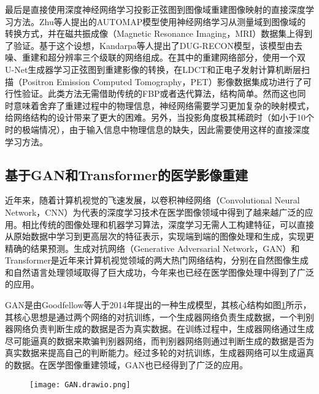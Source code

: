 最后是直接使用深度神经网络学习投影正弦图到图像域重建图像映射的直接深度学习方法。Zhu等人提出的AUTOMAP模型使用神经网络学习从测量域到图像域的转换方式，并在磁共振成像（Magnetic Resonance Imaging，MRI）数据集上得到了验证\cite{zhuImageReconstructionDomaintransform2018}。基于这个设想，Kandarpa等人提出了DUG-RECON模型，该模型由去噪、重建和超分辨率三个级联的网络组成。在其中的重建网络部分，使用一个双U-Net生成器学习正弦图到重建影像的转换，在LDCT和正电子发射计算机断层扫描（Positron Emission Computed Tomography，PET）影像数据集成功进行了可行性验证\cite{kandarpaDUGRECONFrameworkDirect2021}。此类方法无需借助传统的FBP或者迭代算法，结构简单。然而这也同时意味着舍弃了重建过程中的物理信息，神经网络需要学习更加复杂的映射模式，给网络结构的设计带来了更大的困难。另外，当投影角度极其稀疏时（如小于10个时的极端情况），由于输入信息中物理信息的缺失，因此需要使用这样的直接深度学习方法。


\subsection{基于GAN和Transformer的医学影像重建}
近年来，随着计算机视觉的飞速发展，以卷积神经网络（Convolutional Neural Network，CNN）为代表的深度学习技术在医学图像领域中得到了越来越广泛的应用。相比传统的图像处理和机器学习算法，深度学习无需人工构建特征，可以直接从原始数据中学习到更高层次的特征表示，实现端到端的图像处理和生成，实现更精确的结果预测。生成对抗网络（Generative Adversarial Network，GAN）和Transformer是近年来计算机视觉领域的两大热门网络结构，分别在自然图像生成和自然语言处理领域取得了巨大成功，今年来也已经在医学图像处理中得到了广泛的应用。

GAN是由Goodfellow等人\cite{goodfellowGenerativeAdversarialNets2014}于2014年提出的一种生成模型，其核心结构如图\ref{fig. GAN}所示，其核心思想是通过两个网络的对抗训练，一个生成器网络负责生成数据，一个判别器网络负责判断生成的数据是否为真实数据。在训练过程中，生成器网络通过生成尽可能逼真的数据来欺骗判别器网络，而判别器网络则通过判断生成的数据是否为真实数据来提高自己的判断能力。经过多轮的对抗训练，生成器网络可以生成逼真的数据。在医学图像重建领域，GAN也已经得到了广泛的应用。

\begin{figure}[!htp]
  \centering
  \texttt{[image: GAN.drawio.png]}
  \label{fig. GAN}
\end{figure}


